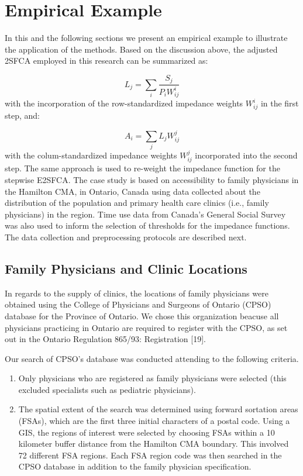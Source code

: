 \documentclass[10pt,letterpaper]{article}
\begin{document}
\section{Empirical Example}\label{empirical-example}

In this and the following sections we present an empirical example to
illustrate the application of the methods. Based on the discussion
above, the adjusted 2SFCA employed in this research can be summarized
as:

\[
L_{j}=\sum_i\frac{S_j}{P_iW_{ij}^{i}}
\] with the incorporation of the row-standardized impedance weights
\(W_{ij}^i\) in the first step, and:

\[
A_i = \sum_j{L_jW_{ij}^{j}}
\] with the colum-standardized impedance weights \(W_{ij}^j\)
incorporated into the second step. The same approach is used to
re-weight the impedance function for the stepwise E2SFCA. The case study
is based on accessibility to family physicians in the Hamilton CMA, in
Ontario, Canada using data collected about the distribution of the
population and primary health care clinics (i.e., family physicians) in
the region. Time use data from Canada's General Social Survey was also
used to inform the selection of thresholds for the impedance functions.
The data collection and preprocessing protocols are described next.

\subsection{Family Physicians and Clinic
Locations}\label{family-physicians-and-clinic-locations}

In regards to the supply of clinics, the locations of family physicians
were obtained using the College of Physicians and Surgeons of Ontario
(CPSO) database for the Province of Ontario. We chose this organization
beacuse all physicians practicing in Ontario are required to register
with the CPSO, as set out in the Ontario Regulation 865/93: Registration
{[}19{]}.

Our search of CPSO's database was conducted attending to the following
criteria.

\begin{enumerate}
\def\labelenumi{\arabic{enumi})}
\item
  Only physicians who are registered as family physicians were selected
  (this excluded specialists such as pediatric physicians).
\item
  The spatial extent of the search was determined using forward
  sortation areas (FSAs), which are the first three initial characters
  of a postal code. Using a GIS, the regions of interest were selected
  by choosing FSAs within a 10 kilometer buffer distance from the
  Hamilton CMA boundary. This involved 72 different FSA regions. Each
  FSA region code was then searched in the CPSO database in addition to
  the family physician specification.
\end{enumerate}
\end{document}
